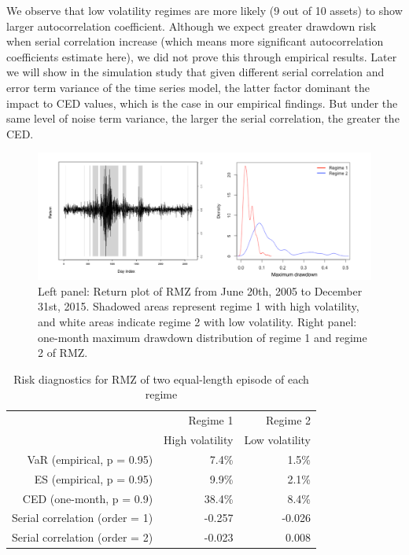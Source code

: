 \documentclass[11pt]{article}
\begin{document}
We observe that low volatility regimes are more likely (9 out of 10 assets) to show larger autocorrelation coefficient. Although we expect greater drawdown risk when serial correlation increase (which means more significant autocorrelation coefficients estimate here), we did not prove this through empirical results. Later we will show in the simulation study that given different serial correlation and error term variance of the time series model, the latter factor dominant the impact to CED values, which is the case in our empirical findings. But under the same level of noise term variance, the larger the serial correlation, the greater the CED.

\begin{figure}[H]
    \centering
    \includegraphics[width=1\textwidth]{../results/regime/RMZ_regime}
    \caption{Left panel: Return plot of RMZ from June 20th, 2005 to December 31st, 2015. Shadowed areas represent regime 1 with high volatility, and white areas indicate regime 2 with low volatility. Right panel: one-month maximum drawdown distribution of regime 1 and regime 2 of RMZ.}
    \label{fig: RMZregime}
\end{figure}

\begin{table}[H]
    \centering 
    \begin{tabular}{| r | r | r |} 
        \hline
        & Regime 1 & Regime 2 \\
        & High volatility & Low volatility \\
        \hline 
        VaR (empirical, p = 0.95) & 7.4\% & 1.5\% \\
        ES (empirical, p = 0.95) & 9.9\% & 2.1\% \\
        CED (one-month, p = 0.9) & 38.4\% & 8.4\% \\
        Serial correlation (order = 1) & -0.257 & -0.026 \\
        Serial correlation (order = 2) & -0.023 & 0.008 \\
        \hline
    \end{tabular}
    \caption{Risk diagnostics for RMZ of two equal-length episode of each regime} 
    \label{table:ridkDiagsRegimeRMZ}
\end{table}
\end{document}
